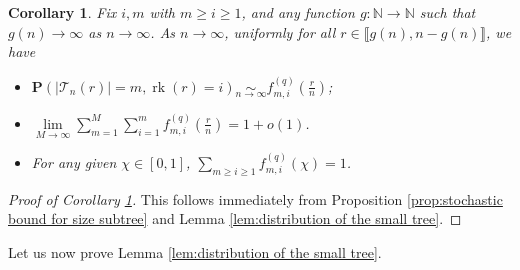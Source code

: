 \documentclass{article}
\newtheorem{corollary}[theorem]{Corollary}
\theoremstyle{remark}
\newcommand{\bN}{\mathbb{N}}
\newcommand{\abs}[1]{{\left|#1\right|}}
\newcommand{\cT}{\mathcal{T}}
\newcommand{\prob}[1]{\mathbf{P}{\left(#1\right)}}
\DeclareMathOperator{\rk}{rk}
\begin{document}
\begin{corollary}
\label{cor:sums at 1}
Fix $i,m$ with $m \geq i \geq 1$, and any function $g: \bN \rightarrow \bN$ such that $g(n) \rightarrow \infty$ as $n \rightarrow \infty$. As $n \rightarrow \infty$, uniformly for all $r \in \llbracket g(n), n-g(n) \rrbracket$, we have
\begin{itemize}
    \item[(i)]  $\prob{\abs{\cT_n(r)}=m, \rk(r)=i} \underset{n \rightarrow \infty}{\sim} f_{m,i}^{(q)}\left(\frac{r}{n}\right)$;
    \item[(ii)] $\lim\limits_{M \rightarrow \infty}\sum\limits_{m=1}^M\sum\limits_{i=1}^m f_{m,i}^{(q)}\left( \frac{r}{n} \right) = 1 + o(1)$.
    \item[(iii)] For any given $\chi\in[0,1]$, $\sum_{m\ge i\ge 1} f_{m,i}^{(q)}(\chi) = 1$.
\end{itemize}
\end{corollary}

\begin{proof}[Proof of Corollary \ref{cor:sums at 1}]
This follows immediately from Proposition \ref{prop:stochastic bound for size subtree} and Lemma \ref{lem:distribution of the small tree}.    
\end{proof}

Let us now prove Lemma \ref{lem:distribution of the small tree}.
\end{document}

